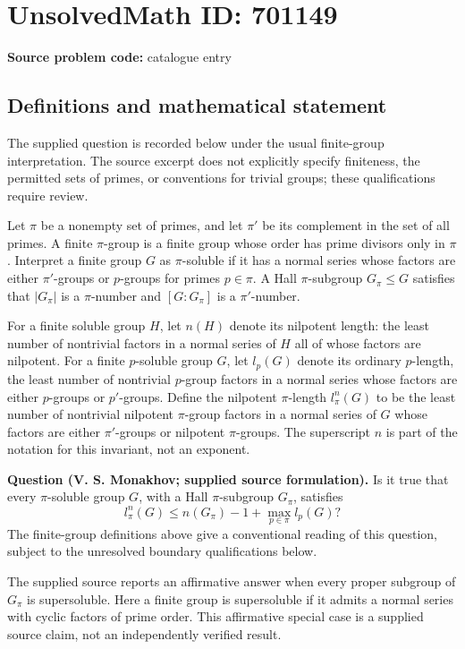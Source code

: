 \documentclass[11pt]{article}
\begin{document}
\section*{UnsolvedMath ID: 701149}
\textbf{Source problem code:} catalogue entry
\subsection{Definitions and mathematical statement}
The supplied question is recorded below under the usual finite-group interpretation. The source excerpt does not explicitly specify finiteness, the permitted sets of primes, or conventions for trivial groups; these qualifications require review.

Let \(\pi\) be a nonempty set of primes, and let \(\pi'\) be its complement in the set of all primes. A finite \(\pi\)-group is a finite group whose order has prime divisors only in \(\pi\). Interpret a finite group \(G\) as \(\pi\)-soluble if it has a normal series whose factors are either \(\pi'\)-groups or \(p\)-groups for primes \(p\in\pi\). A Hall \(\pi\)-subgroup \(G_\pi\leq G\) satisfies that \(|G_\pi|\) is a \(\pi\)-number and \([G:G_\pi]\) is a \(\pi'\)-number.

For a finite soluble group \(H\), let \(n(H)\) denote its nilpotent length: the least number of nontrivial factors in a normal series of \(H\) all of whose factors are nilpotent. For a finite \(p\)-soluble group \(G\), let \(l_p(G)\) denote its ordinary \(p\)-length, the least number of nontrivial \(p\)-group factors in a normal series whose factors are either \(p\)-groups or \(p'\)-groups. Define the nilpotent \(\pi\)-length \(l_\pi^n(G)\) to be the least number of nontrivial nilpotent \(\pi\)-group factors in a normal series of \(G\) whose factors are either \(\pi'\)-groups or nilpotent \(\pi\)-groups. The superscript \(n\) is part of the notation for this invariant, not an exponent.

\textbf{Question (V. S. Monakhov; supplied source formulation).} Is it true that every \(\pi\)-soluble group \(G\), with a Hall \(\pi\)-subgroup \(G_\pi\), satisfies
\[
 l_\pi^n(G)\leq n(G_\pi)-1+\max_{p\in\pi}l_p(G)?
\]
The finite-group definitions above give a conventional reading of this question, subject to the unresolved boundary qualifications below.

The supplied source reports an affirmative answer when every proper subgroup of \(G_\pi\) is supersoluble. Here a finite group is supersoluble if it admits a normal series with cyclic factors of prime order. This affirmative special case is a supplied source claim, not an independently verified result.
\end{document}
